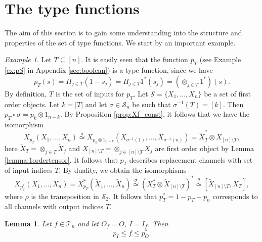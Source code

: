 \documentclass[12pt]{article}
\newtheorem{lemma}{Lemma}
\theoremstyle{definition}
\theoremstyle{remark}
\newtheorem{exm}{Example}
\def\Te{\mathcal T}
\def\Se {\mathcal S}
\def\permut{\mathscr{S}}
\begin{document}
\section{The type functions}

The aim of this section is to gain some understanding into the structure and properties of
the set of type functions. We start by an important example.


\begin{exm}\label{exm:type_channels}
Let $T\subseteq [n]$. It is easily seen that the function  $p_T$ (see Example \ref{ex:pS}
in Appendix \ref{sec:boolean}) is a type function, since we have
\[
p_T(s)=\Pi_{j\in T}(1-s_j)=\Pi_{j\in T} 1^*(s_j)=(\otimes_{j\in T}1^*)(s).
\]
By definition, $T$ is the set of inputs for $p_T$. Let $\Se=\{X_1,\dots, X_n\}$ be a set
of first order objects. Let $k=|T|$ and let $\sigma\in \permut_n$ be such that
$\sigma^{-1}(T)=[k]$. Then 
$p_T\circ \sigma=p_{k}\otimes 1_{n-k}$. By Proposition \ref{prop:Xf_const}, it follows that
we have the isomorphism  
\[
X_{p_T}(X_1,\dots,X_n)\overset{\sigma}{\simeq}X_{p_{k}\otimes 1_{n-k}}(X_{\sigma^{-1}(1)},\dots, X_{\sigma^{-1}(n)})=\tilde
X_T^*\otimes X_{[n]\setminus T},
\]
here $\tilde X_T=\otimes_{j\in T} \tilde X_j$ and $X_{[n]\setminus T}=\otimes_{j\in
[n]\setminus T} X_j$ are first order object by Lemma \ref{lemma:1ordertensor}.
It follows that $p_T$ describes replacement channels with set of input indices  $T$. By duality,
we obtain the isomorphisms
\[
X_{p_T^*}(X_1,\dots,X_n)=X_{p_T}^*(\tilde X_1,\dots,\tilde X_n)\overset{\sigma}{\simeq} (X_T^*\otimes \tilde
X_{[n]\setminus T})^*\overset{\rho}{\simeq}  [\tilde X_{[n]\setminus T},X_T],
\]
where $\rho$ is the transposition in $\permut_2$. It follows
that $p^*_T=1-p_T+p_{n}$ corresponds to all channels with output indices $T$.

\end{exm}


\begin{lemma}\label{lemma:fh_setting} Let $f\in\Te_n$ and let $O_f=O$,  $I=I_f$. Then
\[
p_I\le f\le p_O^*.
\]

\end{lemma}
\end{document}
